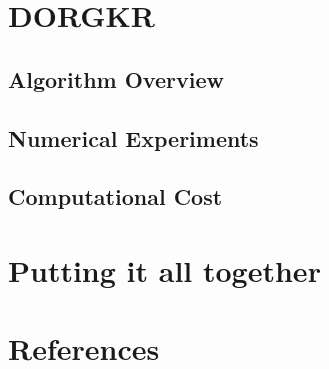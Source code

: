 \documentclass[12pt]{article}
\begin{document}
    \section{DORGKR}
    \subsection{Algorithm Overview}
    \subsection{Numerical Experiments}
    \subsection{Computational Cost}
    \section{Putting it all together}
    \section{References}
\end{document}
